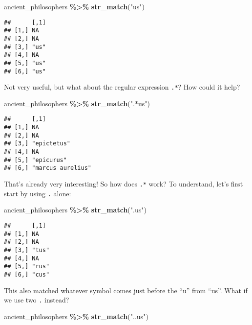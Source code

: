 \documentclass[
]{article}
\newenvironment{Shaded}{\begin{snugshade}}{\end{snugshade}}
\newcommand{\KeywordTok}[1]{\textcolor[rgb]{0.13,0.29,0.53}{\textbf{#1}}}
\newcommand{\NormalTok}[1]{#1}
\newcommand{\OperatorTok}[1]{\textcolor[rgb]{0.81,0.36,0.00}{\textbf{#1}}}
\newcommand{\StringTok}[1]{\textcolor[rgb]{0.31,0.60,0.02}{#1}}
\begin{document}
\begin{Shaded}
\begin{Highlighting}[]
\NormalTok{ancient\_philosophers }\OperatorTok{\%\textgreater{}\%}
\StringTok{  }\KeywordTok{str\_match}\NormalTok{(}\StringTok{"us"}\NormalTok{)}
\end{Highlighting}
\end{Shaded}

\begin{verbatim}
##      [,1]
## [1,] NA  
## [2,] NA  
## [3,] "us"
## [4,] NA  
## [5,] "us"
## [6,] "us"
\end{verbatim}

Not very useful, but what about the regular expression \texttt{.*}? How could it help?

\begin{Shaded}
\begin{Highlighting}[]
\NormalTok{ancient\_philosophers }\OperatorTok{\%\textgreater{}\%}
\StringTok{  }\KeywordTok{str\_match}\NormalTok{(}\StringTok{".*us"}\NormalTok{)}
\end{Highlighting}
\end{Shaded}

\begin{verbatim}
##      [,1]             
## [1,] NA               
## [2,] NA               
## [3,] "epictetus"      
## [4,] NA               
## [5,] "epicurus"       
## [6,] "marcus aurelius"
\end{verbatim}

That's already very interesting! So how does \texttt{.*} work? To understand, let's first start by using
\texttt{.} alone:

\begin{Shaded}
\begin{Highlighting}[]
\NormalTok{ancient\_philosophers }\OperatorTok{\%\textgreater{}\%}
\StringTok{  }\KeywordTok{str\_match}\NormalTok{(}\StringTok{".us"}\NormalTok{)}
\end{Highlighting}
\end{Shaded}

\begin{verbatim}
##      [,1] 
## [1,] NA   
## [2,] NA   
## [3,] "tus"
## [4,] NA   
## [5,] "rus"
## [6,] "cus"
\end{verbatim}

This also matched whatever symbol comes just before the ``u'' from ``us''. What if we use two \texttt{.} instead?

\begin{Shaded}
\begin{Highlighting}[]
\NormalTok{ancient\_philosophers }\OperatorTok{\%\textgreater{}\%}
\StringTok{  }\KeywordTok{str\_match}\NormalTok{(}\StringTok{"..us"}\NormalTok{)}
\end{Highlighting}
\end{Shaded}
\end{document}
